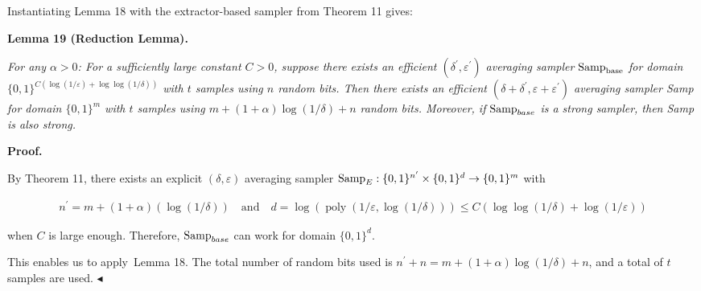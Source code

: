 \documentclass[10pt,a4paper]{article}
\begin{document}
Instantiating Lemma 18 with the extractor-based sampler from Theorem 11 gives:\par





\par\medskip\noindent\textbf{
\textbf{Lemma 19}\textbf{ }(Reduction Lemma)\textbf{.}
}\par



\emph{For any $\alpha>0$: For a sufficiently large constant $C>0$, suppose there exists an efficient $({\delta^{\prime}},\varepsilon^{\prime})$ averaging sampler $\textup{{Samp}}_{\text{base}}$ for domain $\{0,1\}^{C(\log(1/\varepsilon)+\log\log(1/\delta))}$ with $t$ samples using $n$ random bits. Then there exists an efficient $(\delta+\delta^{\prime},\varepsilon+\varepsilon^{\prime})$ averaging sampler Samp for domain $\{0,1\}^{m}$ with $t$ samples using
$m+(1+\alpha)\log(1/\delta)+n$
random bits. Moreover, if $\textup{{Samp}}_{base}$ is a strong sampler, then Samp is also strong.}\par







\par\medskip\noindent\textbf{Proof.}\par




By Theorem 11, there exists an explicit $(\delta,\varepsilon)$ averaging sampler $\textup{{Samp}}_{E}:\{0,1\}^{n^{\prime}}\times\{0,1\}^{d}\to\{0,1\}^{m}$ with\par


\[\begin{gathered}
n^{\prime}={m+(1+\alpha)(\log(1/\delta))}\quad\text{and}\quad d=\log(\operatorname*{poly}(1/\varepsilon,\log(1/\delta)))\leq C(\log\log(1/\delta)+\log(1/\varepsilon))
\end{gathered}\]


when $C$ is large enough.
Therefore, $\textup{{Samp}}_{base}$ can work for domain $\{0,1\}^{d}$.\par




This enables us to apply Lemma 18. The total number of random bits used is $n^{\prime}+n=m+(1+\alpha)\log(1/\delta)+n$, and a total of $t$ samples are used.
$\blacktriangleleft$\par
\end{document}
